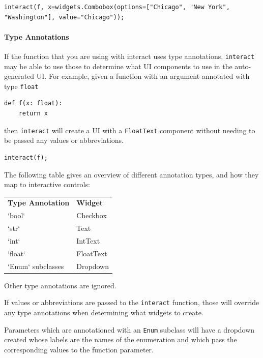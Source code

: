 \begin{verbatim}
interact(f, x=widgets.Combobox(options=["Chicago", "New York", "Washington"], value="Chicago"));
\end{verbatim}

\paragraph{Type Annotations}

If the function that you are using with interact uses type annotations, \texttt{interact} may be able to use those to determine what UI components to use in the auto-generated UI.  For example, given a function with an argument annotated with type \texttt{float}

\begin{verbatim}
def f(x: float):
    return x
\end{verbatim}

then \texttt{interact} will create a UI with a \texttt{FloatText} component without needing to be passed any values or abbreviations.

\begin{verbatim}
interact(f);
\end{verbatim}

The following table gives an overview of different annotation types, and how they map to interactive controls:

\bigskip\noindent
\begin{tabular}{p{}p{}}
\toprule
\textbf{Type Annotation} & \textbf{Widget} \\
`bool` & Checkbox \\
`str` & Text \\
`int` & IntText \\
`float` & FloatText \\
`Enum` subclasses & Dropdown \\
\bottomrule
\end{tabular}

\bigskip

Other type annotations are ignored.

If values or abbreviations are passed to the \texttt{interact} function, those will override any type annotations when determining what widgets to create.

Parameters which are annotationed with an \texttt{Enum} subclass will have a dropdown created whose labels are the names of the enumeration and which pass the corresponding values to the function parameter.

